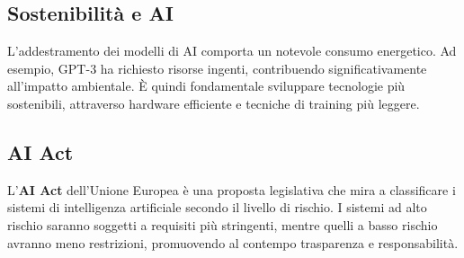 \subsection{Sostenibilità e AI}

L’addestramento dei modelli di AI comporta un notevole consumo energetico. Ad esempio, GPT-3 ha richiesto risorse ingenti, contribuendo significativamente all’impatto ambientale. È quindi fondamentale sviluppare tecnologie più sostenibili, attraverso hardware efficiente e tecniche di training più leggere.

\subsection{AI Act}

L’\textbf{AI Act} dell’Unione Europea è una proposta legislativa che mira a classificare i sistemi di intelligenza artificiale secondo il livello di rischio. I sistemi ad alto rischio saranno soggetti a requisiti più stringenti, mentre quelli a basso rischio avranno meno restrizioni, promuovendo al contempo trasparenza e responsabilità.
